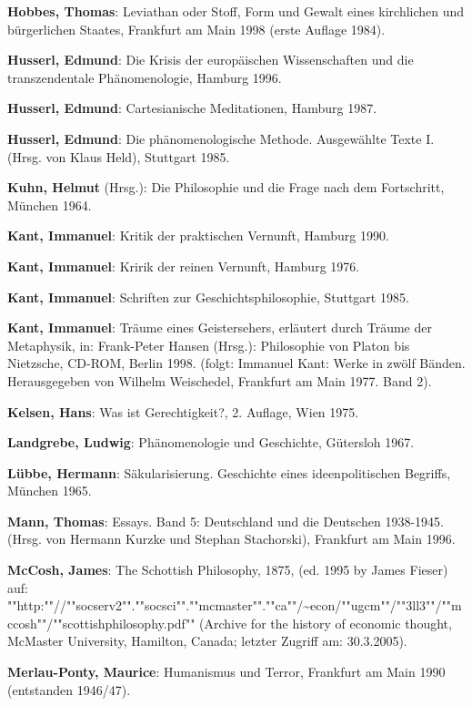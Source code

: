 {\bf Hobbes, Thomas}: Leviathan oder Stoff, Form und Gewalt eines kirchlichen
und bürgerlichen Staates, Frankfurt am Main 1998 (erste Auflage 1984).

{\bf Husserl, Edmund}: Die Krisis der europäischen Wissenschaften und die
transzendentale Phänomenologie, Hamburg 1996.

{\bf Husserl, Edmund}: Cartesianische Meditationen, Hamburg 1987.

{\bf Husserl, Edmund}: Die phänomenologische Methode. Ausgewählte Texte
I. (Hrsg. von Klaus Held), Stuttgart 1985.

{\bf Kuhn, Helmut} (Hrsg.): Die Philosophie und die Frage nach dem
Fortschritt, München 1964.

{\bf Kant, Immanuel}: Kritik der praktischen Vernunft, Hamburg 1990.

{\bf Kant, Immanuel}: Kririk der reinen Vernunft, Hamburg 1976.

{\bf Kant, Immanuel}: Schriften zur Geschichtsphilosophie, Stuttgart 1985.

{\bf Kant, Immanuel}: Träume eines Geistersehers, erläutert durch Träume der
Metaphysik, in: Frank-Peter Hansen (Hrsg.): Philosophie von Platon bis
Nietzsche, CD-ROM, Berlin 1998. (folgt: Immanuel Kant: Werke in zwölf Bänden.
Herausgegeben von Wilhelm Weischedel, Frankfurt am Main 1977. Band 2).

{\bf Kelsen, Hans}: Was ist Gerechtigkeit?, 2. Auflage, Wien 1975.

{\bf Landgrebe, Ludwig}: Phänomenologie und Geschichte, Gütersloh 1967.


{\bf Lübbe, Hermann}: Säkularisierung. Geschichte eines ideenpolitischen
Begriffs, München 1965.

{\bf Mann, Thomas}: Essays. Band 5: Deutschland und die Deutschen 1938-1945.
(Hrsg. von Hermann Kurzke und Stephan Stachorski), Frankfurt am Main 1996.

{\bf McCosh, James}: The Schottish Philosophy, 1875, (ed. 1995 by James
Fieser) auf: ""http:""//""socserv2"".""socsci"".""mcmaster"".""ca""/\~{ }econ/""ugcm""/""3ll3""/""mccosh""/""scottishphilosophy.pdf"" 
(Archive for
the history of economic thought, McMaster University, Hamilton, Canada;
letzter Zugriff am: 30.3.2005).

{\bf Merlau-Ponty, Maurice}: Humanismus und Terror, Frankfurt am Main 1990
(entstanden 1946/47).

